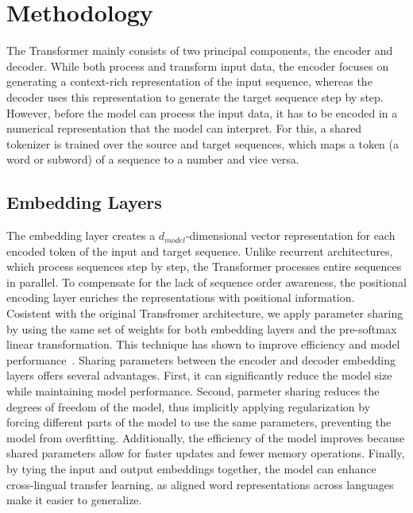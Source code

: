 \section{Methodology} The Transformer mainly consists of two principal components, the encoder and decoder.
While both process and transform input data, the encoder focuses on generating a context-rich representation of the input sequence, whereas the decoder uses this representation to generate the target sequence step by step.
However, before the model can process the input data, it has to be encoded in a numerical representation that the model can interpret.
For this, a shared tokenizer is trained over the source and target sequences, which maps a token (a word or subword) of a sequence to a number and vice versa. 


\subsection{Embedding Layers} 
The embedding layer creates a \texttt{$d_{model}$}-dimensional vector representation for each encoded token of the input and target sequence. 
Unlike recurrent architectures, which process sequences step by step, the Transformer processes entire sequences in parallel. 
To compensate for the lack of sequence order awareness, the positional encoding layer enriches the representations with positional information.  \\
Cosistent with the original Transfromer architecture, we apply parameter sharing by using the same set of weights for both embedding layers and the pre-softmax linear transformation. This technique has shown to improve efficiency and model performance~\cite{press2017usingoutputembeddingimprove}.
Sharing parameters between the encoder and decoder embedding layers offers several advantages.
First, it can significantly reduce the model size while maintaining model performance.
Second, parmeter sharing reduces the degrees of freedom of the model, thus implicitly applying regularization by forcing different parts of the model to use the same parameters, preventing the model from overfitting.
Additionally, the efficiency of the model improves because shared parameters allow for faster updates and fewer memory operations.
Finally, by tying the input and output embeddings together, the model can enhance cross-lingual transfer learning, as aligned word representations across languages make it easier to generalize.


